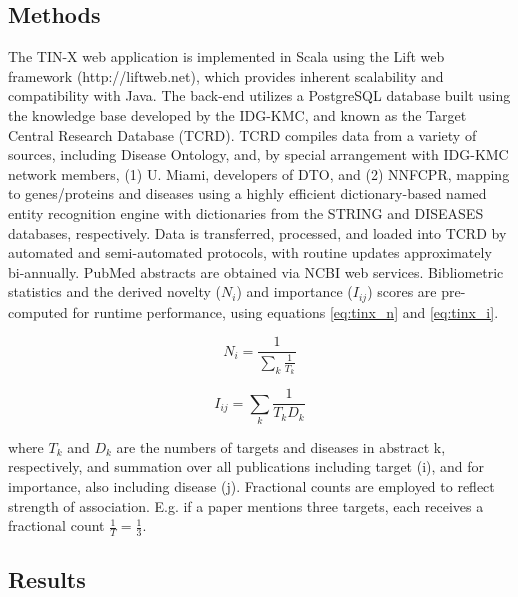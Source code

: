\subsection{Methods}

The TIN-X web application is implemented in Scala using the Lift web framework (http://liftweb.net), which provides inherent scalability and compatibility with Java.  The back-end utilizes a PostgreSQL database built using the knowledge base developed by the IDG-KMC, and known as the Target Central Research Database (TCRD)\cite{Nguyen2017-lo}.  TCRD compiles data from a variety of sources, including Disease Ontology, and, by special arrangement with IDG-KMC network members, (1) U. Miami, developers of DTO, and (2) NNFCPR, mapping to genes/proteins and diseases using a highly efficient dictionary-based named entity recognition engine\cite{Pafilis2013-ml} with dictionaries from the STRING\cite{Szklarczyk2015-bl} and DISEASES\cite{Pletscher-Frankild2015-oo} databases, respectively.  Data is transferred, processed, and loaded into TCRD by automated and semi-automated protocols, with routine updates approximately bi-annually.  PubMed abstracts are obtained via NCBI web services.  Bibliometric statistics and the derived novelty ($N_i$) and importance ($I_{ij}$) scores are pre-computed for runtime performance, using equations \ref{eq:tinx_n} and \ref{eq:tinx_i}.

\begin{equation}
N_i = \frac{1}{\sum_{k}^{}\frac{1}{T_k}}
\label{eq:tinx_n}
\end{equation}

\begin{equation}
I_{ij} = \sum_{k}^{}\frac{1}{T_kD_k}
\label{eq:tinx_i}
\end{equation}

where $T_k$ and $D_k$ are the numbers of targets and diseases in abstract k, respectively, and summation over all publications including target (i), and for importance, also including disease (j). Fractional counts are employed to reflect strength of association.  E.g. if a paper mentions three targets, each receives a fractional count $\frac{1}{T} = \frac{1}{3}$.

\subsection{Results}

